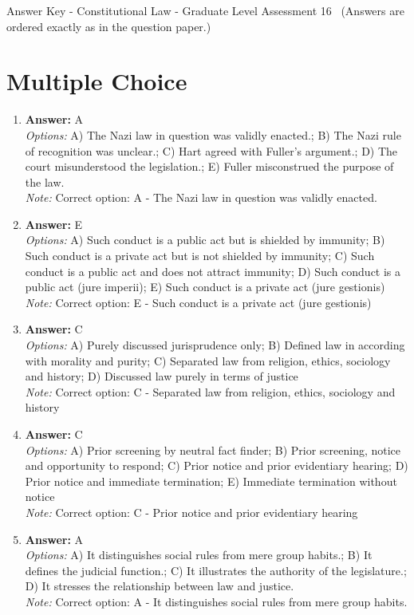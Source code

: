 \documentclass[12pt]{article}
\begin{document}
\begin{center}
Answer Key - Constitutional Law - Graduate Level Assessment 16 \
\small (Answers are ordered exactly as in the question paper.)
\end{center}

\section*{Multiple Choice}
\begin{enumerate}[label=\arabic*.]
\item \textbf{Answer:} A
\\ \textit{Options:} A) The Nazi law in question was validly enacted.; B) The Nazi rule of recognition was unclear.; C) Hart agreed with Fuller's argument.; D) The court misunderstood the legislation.; E) Fuller misconstrued the purpose of the law.
\\ \textit{Note:} Correct option: A - The Nazi law in question was validly enacted.
\item \textbf{Answer:} E
\\ \textit{Options:} A) Such conduct is a public act but is shielded by immunity; B) Such conduct is a private act but is not shielded by immunity; C) Such conduct is a public act and does not attract immunity; D) Such conduct is a public act (jure imperii); E) Such conduct is a private act (jure gestionis)
\\ \textit{Note:} Correct option: E - Such conduct is a private act (jure gestionis)
\item \textbf{Answer:} C
\\ \textit{Options:} A) Purely discussed jurisprudence only; B) Defined law in according with morality and purity; C) Separated law from religion, ethics, sociology and history; D) Discussed law purely in terms of justice
\\ \textit{Note:} Correct option: C - Separated law from religion, ethics, sociology and history
\item \textbf{Answer:} C
\\ \textit{Options:} A) Prior screening by neutral fact finder; B) Prior screening, notice and opportunity to respond; C) Prior notice and prior evidentiary hearing; D) Prior notice and immediate termination; E) Immediate termination without notice
\\ \textit{Note:} Correct option: C - Prior notice and prior evidentiary hearing
\item \textbf{Answer:} A
\\ \textit{Options:} A) It distinguishes social rules from mere group habits.; B) It defines the judicial function.; C) It illustrates the authority of the legislature.; D) It stresses the relationship between law and justice.
\\ \textit{Note:} Correct option: A - It distinguishes social rules from mere group habits.
\end{enumerate}
\end{document}
